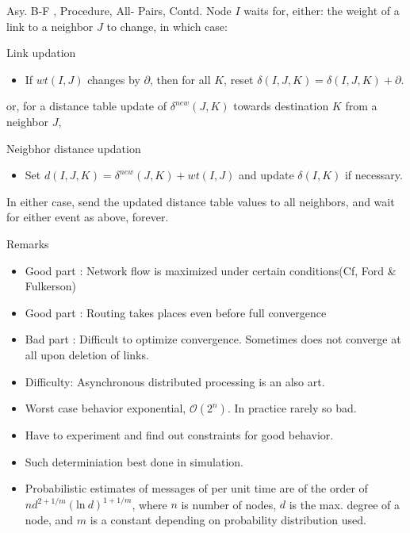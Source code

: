 \begin{frame}{Asy. B-F , Procedure, All- Pairs, Contd.}
Node $I$ waits for, either: the weight of a link to a neighbor $J$ to change, in which case:
\begin{block}{Link updation}
\begin{itemize}
\item[] If $wt(I,J)$ changes by $\partial$, then for all $K$, reset $\delta(I,J,K) = \delta(I,J,K) + \partial$.
\end{itemize}
\end{block} 
or, for a distance table update of $\delta^{new}(J,K)$ towards destination $K$ from a neighbor $J$,
\begin{block}{Neigbhor distance updation}
\begin{itemize}
\item[] Set $d(I,J,K) = \delta^{new}(J,K) + wt(I,J)$  and update $\delta(I,K)$ if necessary.
\end{itemize}
\end{block} 
In either case, send the updated distance table values to all neighbors, and wait for either event as above, forever. 
\end{frame}

\begin{frame}{Remarks}
\begin{itemize}
\item Good part : Network flow is maximized under certain conditions(Cf, Ford \& Fulkerson) 
\item Good part : Routing takes places even before full convergence
\item Bad part : Difficult to optimize convergence. Sometimes does not converge at all upon deletion of links.
\item Difficulty: Asynchronous distributed processing is an also art.
\item Worst case behavior exponential, $\mathcal{O}(2^n)$. In practice rarely so bad.
\item Have to experiment and find out constraints for good behavior.
\item Such determiniation best done in simulation.
\item Probabilistic estimates of messages of per unit time are of the order of $nd^{2+1/m}(\mathrm{ln}\ d)^{1+1/m}$, where $n$ is number of nodes, $d$ is the max. degree of a node, and $m$ is a constant depending on probability distribution used.
\end{itemize}
\end{frame}

